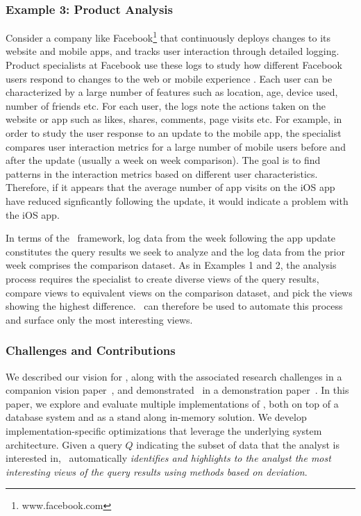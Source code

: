 \subsubsection*{Example 3: Product Analysis}

Consider a company like Facebook\footnote{www.facebook.com} that continuously
deploys changes to its website and mobile apps, and tracks user interaction
through detailed logging. Product specialists at Facebook use these logs to
study how different Facebook users respond to changes to the web or mobile
experience \cite{DBLP:conf/vldb/AbrahamABB13}. Each user can be characterized by a large number
of features such as location, age, device used, number of friends etc.
For each user, the logs note the actions taken on the website or app such
as likes, shares, comments, page visits etc. For example, in order to study
the user response to an update to the mobile app, the specialist compares user
interaction metrics for a large number of mobile users before and after the
update (usually a week on week comparison). The goal is to find patterns in the
interaction metrics based on different user characteristics. Therefore, if it
appears that the average number of app visits on the iOS app have reduced
signficantly following the update, it would indicate a problem with the iOS app.

In terms of the \SeeDB\ framework, log data from the week following the app
update constitutes the query results we seek to analyze and the log data from
the prior week comprises the comparison dataset. As in Examples 1 and 2, the
analysis process requires the specialist to create diverse views of the query
results, compare views to equivalent views on the comparison dataset, and
pick the views showing the highest difference. 
\SeeDB\ can therefore be used to automate this process and surface only the most
interesting views.


\subsubsection*{Challenges and Contributions}

We described our vision for \SeeDB, along with the associated research
challenges in a companion vision paper~\cite{DBLP:conf/vldb/Parameswaran2013},
and demonstrated \SeeDB\ in a demonstration paper~\cite{XXX}.
In this paper, we explore and evaluate multiple implementations of \SeeDB, both
on top of a database system and as a stand along in-memory solution. We develop
implementation-specific optimizations that leverage the underlying system
architecture.
Given a query $Q$ indicating the subset of data that the analyst is interested
in, \SeeDB\ automatically {\em identifies and highlights to the analyst the most
interesting views of the query results using methods based on deviation}. 


